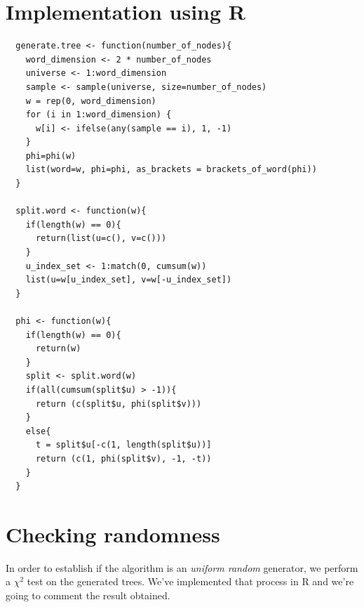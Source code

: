 \section{Implementation using R}

\begin{lstlisting}
  generate.tree <- function(number_of_nodes){
    word_dimension <- 2 * number_of_nodes    
    universe <- 1:word_dimension
    sample <- sample(universe, size=number_of_nodes)
    w = rep(0, word_dimension)
    for (i in 1:word_dimension) {
      w[i] <- ifelse(any(sample == i), 1, -1)
    }    
    phi=phi(w)
    list(word=w, phi=phi, as_brackets = brackets_of_word(phi))
  }

  split.word <- function(w){
    if(length(w) == 0){
      return(list(u=c(), v=c()))
    }    
    u_index_set <- 1:match(0, cumsum(w))
    list(u=w[u_index_set], v=w[-u_index_set])
  }

  phi <- function(w){
    if(length(w) == 0){
      return(w)
    }    
    split <- split.word(w)     
    if(all(cumsum(split$u) > -1)){
      return (c(split$u, phi(split$v)))
    }
    else{
      t = split$u[-c(1, length(split$u))]
      return (c(1, phi(split$v), -1, -t))
    }
  }
\end{lstlisting}

\section{Checking randomness}

In order to establish if the algorithm is an \emph{uniform random}
generator, we perform a $\chi^2$ test on the generated trees. We've
implemented that process in R and we're going to comment the result
obtained.

